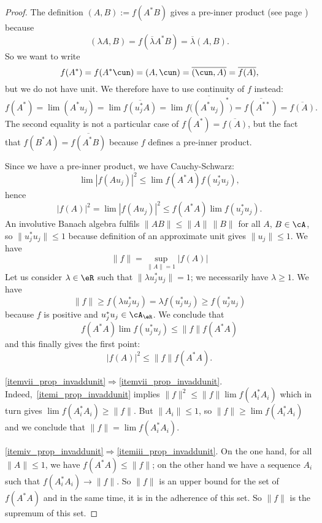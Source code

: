 \begin{proof}
	The definition $(A,B):=f(A^*B)$ gives a pre-inner product (see page \pageref{pgdef_preinned}) because
	\[
		(\lambda A,B)=f(\overline{ \lambda }A^*B)=\overline{ \lambda }(A,B).
	\]
	So we want to write
	\[
		f(A^*)=f(A^*\cun)=(A,\cun)=\overline{ (\cun,A) }=\overline{ f(A) },
	\]
	but we do not have unit. We therefore have to use continuity of $f$ instead:
	\[
		f(A^*)=\lim(A^*u_j)
		=\lim\overline{ f(u_j^*A) }
		=\lim\overline{ f\big( (A^*u_j)^* \big) }
		=\overline{ f(A^{**}) }
		=\overline{ f(A) }.
	\]
	The second equality is not a particular case of $f(A^*)=\overline{ f(A) }$, but the fact that $f(B^*A)=\overline{ f(A^*B) }$ because $f$ defines a pre-inner product.

	Since we have a pre-inner product, we have Cauchy-Schwarz:
	\[
		\lim| f(Au_j) |^2\leq\lim f(A^*A)f(u^*_ju_j),
	\]
	hence
	\begin{equation}
		| f(A) |^2=\lim| f(Au_j) |^2\leq f(A^*A)\lim f(u^*_ju_j).
	\end{equation}
	An involutive Banach algebra fulfils $\| AB \|\leq\| A \|\,\| B \|$ for all $A$, $B\in\cA$, so $\| u^*_ju_j \|\leq 1$ because definition of an approximate unit gives $\| u_j \|\leq 1$. We have
	\[
		\| f \|=\sup_{\| A \|=1}| f(A) |
	\]
	Let us consider $\lambda\in\eR$ such that $\| \lambda u_j^*u_j \|=1$; we necessarily have $\lambda\geq 1$. We have
	\[
		\| f \|\geq f(\lambda u^*_ju_j)=\lambda f(u^*_ju_j)\geq f(u^*_ju_j)
	\]
	because $f$ is positive and $u^*_ju_j\in\cA_{\eR}$. We conclude that
	\[
		f(A^*A)\lim f(u^*_ju_j)\leq \| f \|f(A^*A)
	\]
	and this finally gives the first point:
	\begin{equation}
		| f(A) |^2\leq \| f \|f(A^*A).
	\end{equation}

	\ref{itemvii_prop_invaddunit}$\Rightarrow$\ref{itemvii_prop_invaddunit}. Indeed,~\ref{itemi_prop_invaddunit} implies $\| f \|^2\leq\| f \|\lim f(A_i^*A_i)$ which in turn gives $\lim f(A^*_iA_i)\geq\| f \|$. But $\| A_i \|\leq 1$, so $\| f \|\geq\lim f(A_i^*A_i)$ and we conclude that $\| f \|=\lim f(A_i^*A_i)$.

	\ref{itemiv_prop_invaddunit}$\Rightarrow$\ref{itemiii_prop_invaddunit}. On the one hand, for all $\| A \|\leq 1$, we have $f(A^*A)\leq\| f \|$; on the other hand we have a sequence $A_i$ such that $f(A_i^*A_i)\to\| f \|$. So $\| f \|$ is an upper bound for the set of $f(A^*A)$ and in the same time, it is in the adherence of this set. So $\| f \|$ is the supremum of this set.


\end{proof}
